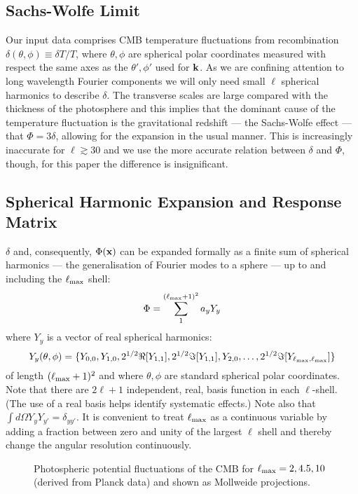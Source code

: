 \documentclass[useAMS,usenatbib,a4paper]{mn2e}
\begin{document}
\subsection{Sachs-Wolfe Limit}

Our input data comprises CMB temperature fluctuations from
recombination $\delta(\theta,\phi)\equiv\delta T/T$, where
$\theta,\phi$ are spherical polar coordinates measured with respect
the same axes as the $\theta',\phi'$ used for $\bf k$. As we are
confining attention to long wavelength Fourier components we will only
need small $\ell$ spherical harmonics to describe $\delta$. The
transverse scales are large compared with the thickness of the
photosphere and this implies that the dominant cause of the
temperature fluctuation is the gravitational redshift --- the
Sachs-Wolfe effect --- that $\Phi=3\delta$, allowing for the expansion
in the usual manner. This is increasingly inaccurate for
$\ell\gtrsim30$ and we use the more accurate relation between $\delta$
and $\Phi$, though, for this paper the difference is insignificant.

\subsection{Spherical Harmonic Expansion and Response Matrix}

$\delta$ and, consequently, $\Phi({\bf x})$ can be expanded formally
as a finite sum of spherical harmonics --- the generalisation of
Fourier modes to a sphere --- up to and including the $\ell_{\rm max}$
shell:
\begin{equation}
\Phi=\sum_1^{(\ell_{\rm max}+1)^2}a_yY_y
\end{equation}
where $Y_y$ is a vector of real spherical harmonics:
\begin{equation}
Y_y(\theta,\phi)=\{Y_{0,0},Y_{1,0},2^{1/2}\Re[Y_{1,1}],2^{1/2}\Im[Y_{1,1}],Y_{2,0},\dots,2^{1/2}\Im[Y_{\ell_{\rm max},\ell_{\rm max}}]\}
\end{equation}
of length $(\ell_{\rm max}+1)^2$ and where $\theta,\phi$ are standard spherical polar coordinates. Note that there are $2\ell+1$ independent, real, basis function in each $\ell$-shell. (The use of a real basis helps identify systematic effects.) Note also that $\int d\Omega Y_yY_{y'}=\delta_{yy'}$. It is convenient to treat $\ell_{\rm max}$ as a continuous variable by adding a fraction between zero and unity of the largest $\ell$ shell and thereby change the angular resolution continuously.
\begin{figure}[t]
\centering
\caption{{\small Photospheric potential fluctuations of the CMB for $\ell_{\rm max}=2,4.5,10$ (derived from Planck data) and shown as Mollweide projections.}}
\end{figure}
\end{document}
